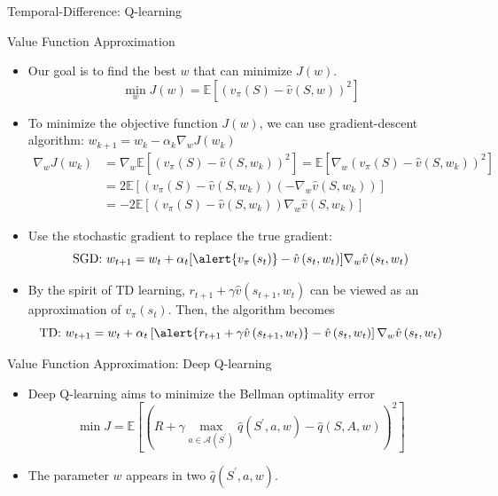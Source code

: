 \documentclass[UTF8, 10pt]{beamer}
\begin{document}
\begin{CJK*}{UTF8}{gbsn}
\begin{frame}{Temporal-Difference: Q-learning}
\begin{itemize}
	\end{itemize}
\end{frame}
\begin{frame}{Value Function Approximation}
	\begin{itemize}
		\item Our goal is to find the best $w$ that can minimize $J(w)$.
			$$
			\min_{w} J(w)=\mathbb{E}\left[\left(v_{\pi}(S)-\hat{v}(S, w)\right)^{2}\right]
			$$
		\item To minimize the objective function $J(w)$, we can use gradient-descent algorithm: $w_{k+1}=w_{k}-\alpha_{k} \nabla_{w} J\left(w_{k}\right)$
			$$\begin{aligned} \nabla_{w} J\left(w_{k}\right) & =\nabla_{w} \mathbb{E}\left[\left(v_{\pi}(S)-\hat{v}\left(S, w_{k}\right)\right)^{2}\right]  =\mathbb{E}\left[\nabla_{w}\left(v_{\pi}(S)-\hat{v}\left(S, w_{k}\right)\right)^{2}\right] \\ & =2 \mathbb{E}\left[\left(v_{\pi}(S)-\hat{v}\left(S, w_{k}\right)\right)\left(-\nabla_{w} \hat{v}\left(S, w_{k}\right)\right)\right] \\ & =-2 \mathbb{E}\left[\left(v_{\pi}(S)-\hat{v}\left(S, w_{k}\right)\right) \nabla_{w} \hat{v}\left(S, w_{k}\right)\right]\end{aligned}$$
		\item Use the stochastic gradient to replace the true gradient:
			$$
			\text{SGD:}\ w_{t+1}=w_{t}+\alpha_{t}[\alert{v_{\pi}\left(s_{t}\right)}-\hat{v}\left(s_{t}, w_{t}\right)] \nabla_{w} \hat{v}\left(s_{t}, w_{t}\right)
			$$
		\item By the spirit of TD learning, $r_{t+1}+\gamma \hat{v}\left(s_{t+1}, w_{t}\right)$ can be viewed as an approximation of $v_\pi(s_t)$. Then, the algorithm becomes
			$$
			\text{TD:}\
			w_{t+1}=w_{t}+\alpha_{t}\left[\alert{r_{t+1}+\gamma \hat{v}\left(s_{t+1}, w_{t}\right)}-\hat{v}\left(s_{t}, w_{t}\right)\right] \nabla_{w} \hat{v}\left(s_{t}, w_{t}\right)
			$$
	\end{itemize}
\end{frame}
\begin{frame}{Value Function Approximation: Deep Q-learning}
	\begin{itemize}
		\item Deep Q-learning aims to minimize the Bellman optimality error
			$$
			\min J=\mathbb{E}\left[\left(R+\gamma \max _{a \in \mathcal{A}\left(S^{\prime}\right)} \hat{q}\left(S^{\prime}, a, w\right)-\hat{q}(S, A, w)\right)^{2}\right]
			$$
		\item The parameter $w$ appears in two $\hat{q}\left(S^{\prime}, a, w\right)$.

\end{itemize}
\end{frame}
\end{CJK*}
\end{document}
